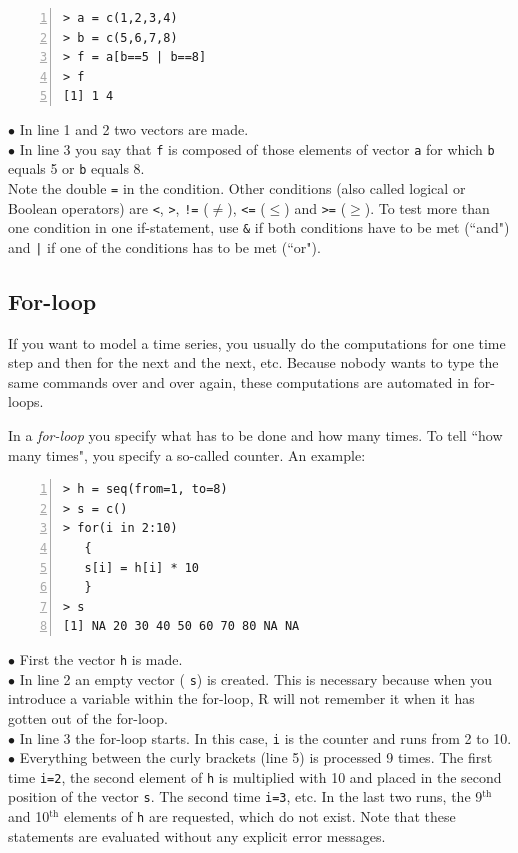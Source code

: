 \documentclass[a4paper,11pt,twocolumn,tablecaptionabove]{scrartcl}
\begin{document}
\begin{Verbatim}[frame=single,numbers=left,gobble=0, xleftmargin=0.35cm, numbersep=0.1cm]
> a = c(1,2,3,4)
> b = c(5,6,7,8)
> f = a[b==5 | b==8]
> f
[1] 1 4
\end{Verbatim}

\noindent $\bullet$ In line 1 and 2 two vectors are made.\\
\noindent $\bullet$ In line 3 you say that \texttt{f} is composed of those elements of vector \texttt{a} for which \texttt{b} equals 5 or \texttt{b} equals 8. \\

Note the double \texttt{=} in the condition. Other conditions (also called logical or Boolean operators) are \texttt{<}, \texttt{>}, \texttt{!=} ($\neq$), \texttt{<=} ($\leq$) and \texttt{>=} ($\geq$). To test more than one condition in one if-statement, use \texttt{\&} if both conditions have to be met (``and") and \texttt{|} if one of the conditions has to be met (``or").

\subsection{For-loop}

If you want to model a time series, you usually do the computations for one time step and then for the next and the next, etc. Because nobody wants to type the same commands over and over again, these computations are automated in for-loops. 

In a \emph{for-loop} you specify what has to be done and how many times. To tell ``how many times", you specify a so-called counter. An example:

\begin{Verbatim}[frame=single,numbers=left,gobble=0, xleftmargin=0.35cm, numbersep=0.1cm]
> h = seq(from=1, to=8)
> s = c()
> for(i in 2:10) 
   {
   s[i] = h[i] * 10
   }
> s
[1] NA 20 30 40 50 60 70 80 NA NA
\end{Verbatim}

\noindent $\bullet$ First the vector  \texttt{h} is made.\\
\noindent $\bullet$ In line 2 an empty vector ( \texttt{s}) is created. This is necessary because when you introduce a variable within the for-loop, R will not remember it when it has gotten out of the for-loop.\\
\noindent $\bullet$  In line 3 the for-loop starts. In this case, \texttt{i} is the counter and runs from 2 to 10.\\
\noindent $\bullet$ Everything between the curly brackets (line 5) is processed 9 times. The first time \texttt{i=2}, the second element of \texttt{h} is multiplied with 10 and placed in the second position of the vector \texttt{s}. The second time \texttt{i=3}, etc. In the last two runs, the 9$^\mathrm{th}$ and 10$^\mathrm{th}$ elements of \texttt{h} are requested, which do not exist. Note that these statements are evaluated without any explicit error messages.
\end{document}
